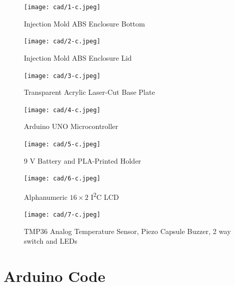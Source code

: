 \documentclass[10pt]{article}
\begin{document}
\noindent

\begin{figure}[H] \centering
	\texttt{[image: cad/1-c.jpeg]}
	\caption{Injection Mold ABS Enclosure Bottom}
	\label{fig:1-c}
\end{figure}


\begin{figure}[H] \centering
	\texttt{[image: cad/2-c.jpeg]}
	\caption{Injection Mold ABS Enclosure Lid}
	\label{fig:2-c}
\end{figure}


\begin{figure}[H] \centering
	\texttt{[image: cad/3-c.jpeg]}
	\caption{Transparent Acrylic Laser-Cut Base Plate}
	\label{fig:3-c}
\end{figure}


\begin{figure}[H] \centering
	\texttt{[image: cad/4-c.jpeg]}
	\caption{Arduino UNO Microcontroller}
	\label{fig:4-c}
\end{figure}


\begin{figure}[H] \centering
	\texttt{[image: cad/5-c.jpeg]}
	\caption{9 V Battery and PLA-Printed Holder}
	\label{fig:5-c}
\end{figure}


\begin{figure}[H] \centering
	\texttt{[image: cad/6-c.jpeg]}
	\caption{Alphanumeric $16\times2$ I\textsuperscript{2}C LCD}
	\label{fig:6-c}
\end{figure}


\begin{figure}[H] \centering
	\texttt{[image: cad/7-c.jpeg]}
	\caption{TMP36 Analog Temperature Sensor, Piezo Capsule Buzzer, 2 way switch and LEDs}
	\label{fig:7-c}
\end{figure}

\section{Arduino Code} \label{sec:code}
\end{document}
